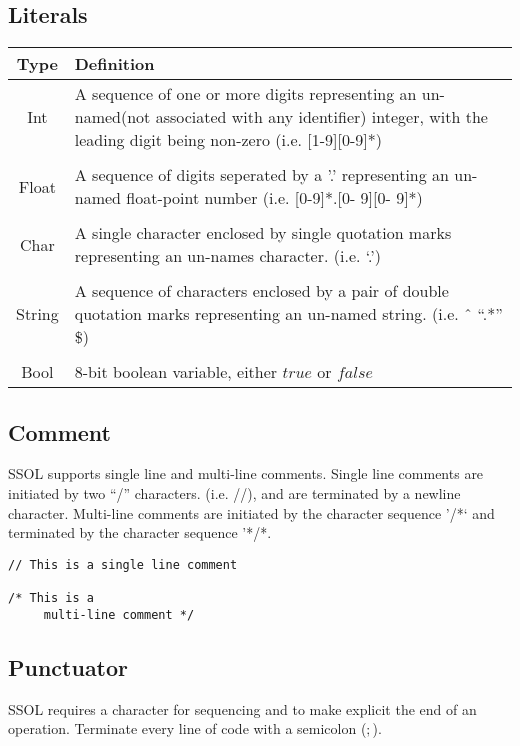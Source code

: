 \documentclass{article}
\begin{document}
\subsection{Literals}
\begin{center}
\begin{tabular}{ |c p{12cm}| }
    \hline 
    \bf Type  & \bf Definition \\
    \hline
    Int & A sequence of one or more digits representing an un-named(not associated with any identifier) integer, with the leading digit being non-zero (i.e. [1-9][0-9]*)\\
    &\\
    Float & A sequence of digits seperated by a ’.’ representing an un-named float-point number (i.e. [0-9]*.[0- 9][0- 9]*)\\
    &\\
    Char & A single character enclosed by single quotation marks representing an un-names character. (i.e. ‘.’)\\
    &\\
    String & A sequence of characters enclosed by a pair of double quotation marks representing an un-named string. (i.e. ˆ “.*” \$)\\
    &\\
    Bool & 8-bit boolean variable, either $true$ or $false$\\
    \hline
    
\end{tabular}
\end{center}
\subsection{Comment}
SSOL supports single line and multi-line comments. Single line comments are initiated by two “/” characters. (i.e. //), and are terminated by a newline character. Multi-line comments are initiated by the character sequence '/*` and terminated by the character sequence '*/*.

\begin{verbatim}
// This is a single line comment

/* This is a
     multi-line comment */
\end{verbatim}

\subsection{Punctuator}
SSOL requires a character for sequencing and to make explicit the end of an operation. Terminate every line of code with a semicolon ($;$).
\end{document}

